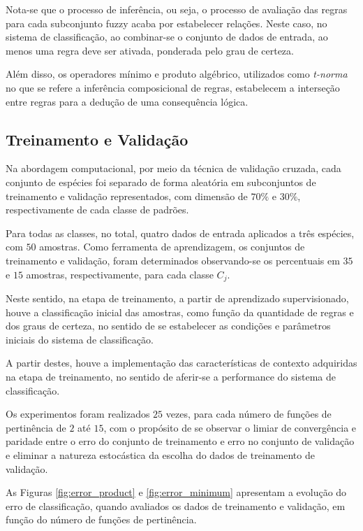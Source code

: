 \documentclass[12pt,a4paper]{article}
\numberwithin{equation}{section}
\begin{document}
Nota-se que o processo de inferência, ou seja, o processo de avaliação das regras para cada subconjunto fuzzy acaba por estabelecer relações. Neste caso, no sistema de classificação, ao combinar-se o conjunto de dados de entrada, ao menos uma regra deve ser ativada, ponderada pelo grau de certeza.

Além disso, os operadores mínimo e produto algébrico, utilizados como \textit{t-norma} no que se refere a inferência composicional de regras, estabelecem a interseção entre regras para a dedução de uma consequência lógica.

\subsection{Treinamento e Validação}
\label{subsection:training}

Na abordagem computacional, por meio da técnica de validação cruzada, cada conjunto de espécies foi separado de forma aleatória em subconjuntos de treinamento e validação representados, com dimensão de $70\%$ e $30\%$, respectivamente de cada classe de padrões.

Para todas as classes, no total, quatro dados de entrada aplicados a três espécies, com $50$ amostras. Como ferramenta de aprendizagem, os conjuntos de treinamento e validação, foram determinados observando-se os percentuais em $35$ e $15$ amostras, respectivamente, para cada classe $C_{j}$.

Neste sentido, na etapa de treinamento, a partir de aprendizado supervisionado, houve a classificação inicial das amostras, como função da quantidade de regras e dos graus de certeza, no sentido de se estabelecer as condições e parâmetros iniciais do sistema de classificação.

A partir destes, houve a implementação das características de contexto adquiridas na etapa de treinamento, no sentido de aferir-se a performance do sistema de classificação.

Os experimentos foram realizados $25$ vezes, para cada número de funções de pertinência de $2$ até $15$, com o propósito de se observar o limiar de convergência e paridade entre o erro do conjunto de treinamento e erro no conjunto de validação e eliminar a natureza estocástica da escolha do dados de treinamento de validação.

As Figuras \ref{fig:error_product} e \ref{fig:error_minimum} apresentam a evolução do erro de classificação, quando avaliados os dados de treinamento e validação, em função do número de funções de pertinência.
\end{document}

